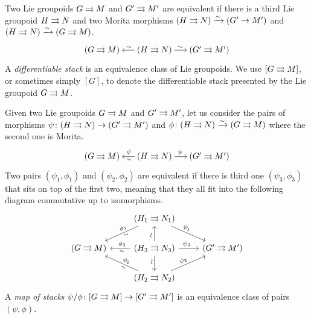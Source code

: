 %
%

Two Lie groupoids $G\rightrightarrows M$ and $G'\rightrightarrows M'$ are equivalent if there is a third Lie groupoid $H\rightrightarrows N$ and two Morita morphisms $(H\rightrightarrows N)\xrightarrow\sim (G'\to M')$ and $(H\rightrightarrows N)\xrightarrow\sim (G\rightrightarrows M)$.
\begin{equation}
\begin{tikzcd}[sep = small]
 (G\tto M) & (H\tto N) \ar[shorten = -.15em]{l}[pos=.45, above]{\sim} \ar[shorten = -.15em]{r}[pos=.45]{\sim} & (G'\tto M')
\end{tikzcd}
\end{equation}
A \emph{differentiable stack} is an equivalence class of Lie groupoids.
We use $[G\rightrightarrows M]$, or sometimes simply $[G]$, to denote the differentiable stack presented by the Lie groupoid $G\rightrightarrows M$.

Given two Lie groupoids $G\rightrightarrows M$ and $G'\rightrightarrows M'$, let us consider the pairs of morphisms $\psi\colon (H\rightrightarrows N)\to (G'\rightrightarrows M')$ and $\phi\colon (H\rightrightarrows N)\xrightarrow\sim (G\rightrightarrows M)$ where the second one is Morita.
\begin{equation}
\begin{tikzcd}[sep = small]
 (G\tto M) & (H\tto N) \ar[shorten = -.15em]{l}[pos=.45, sloped, below]{\sim}[pos=.45, sloped, above]{\phi} \ar[shorten = -.15em]{r}[pos=.45]{\psi} & (G'\tto M')
\end{tikzcd}
\end{equation}
Two pairs $(\psi_1, \phi_1)$ and $(\psi_2, \phi_2)$ are equivalent if there is third one $(\psi_3, \phi_3)$ that sits on top of the first two, meaning that they all fit into the following diagram commutative up to isomorphisms.
\begin{equation}
\begin{tikzcd}
  & (H_1\tto N_1) \ar{dl}[pos=.4, sloped, below]{\sim}[pos=.4, sloped, above]{\phi_1} \ar{dr}[pos=.4, sloped, above]{\psi_1} & \\
 (G\tto M) & (H_3\tto N_3) \ar{l}[pos=.4, sloped, below]{\sim}[pos=.4, sloped, above]{\phi_3} \ar{u}[pos=.4, sloped, above]{\sim} \ar{r}[pos=.4, sloped, above]{\psi_3} \ar{d}[pos=.4, sloped, below]{\sim} & (G'\tto M') \\
  & (H_2\tto N_2) \ar{ul}[pos=.4, sloped, above]{\phi_2}[pos=.4, sloped, below]{\sim} \ar{ur}[pos=.4, sloped, above]{\psi_2} &
\end{tikzcd}
\end{equation}
%
A \emph{map of stacks} $\psi/\phi\colon [G\rightrightarrows M]\to [G'\rightrightarrows M']$ is an equivalence class of pairs $(\psi, \phi)$.

